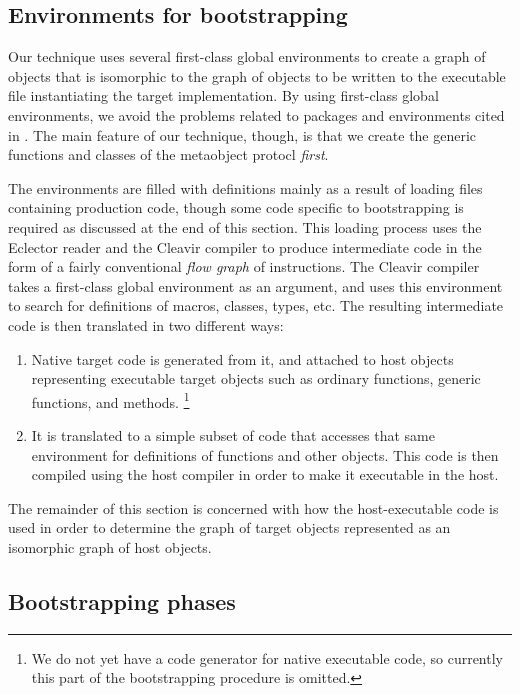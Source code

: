 \subsection{Environments for bootstrapping}

Our technique uses several first-class global environments
\cite{Strandh:2015:ELS:Environments} to create a graph of objects that
is isomorphic to the graph of objects to be written to the executable
file instantiating the target \commonlisp{} implementation.  By using
first-class global environments, we avoid the problems related to
packages and environments cited in .  The main
feature of our technique, though, is that we create the generic
functions and classes of the metaobject protocl \emph{first}.

The environments are filled with definitions mainly as a result of
loading files containing production \sicl{} code, though some code
specific to bootstrapping is required as discussed at the end of this
section.  This loading process uses the Eclector reader and the
Cleavir compiler to produce intermediate code in the form of a fairly
conventional \emph{flow graph} of instructions.  The Cleavir compiler
takes a first-class global environment as an argument, and uses this
environment to search for definitions of macros, classes, types, etc.
The resulting intermediate code is then translated in two different
ways:

\begin{enumerate}
\item Native target code is generated from it, and attached to host
  objects representing executable target objects such as ordinary
  functions, generic functions, and methods.%
  \footnote{We do not yet have a code generator for native executable
    code, so currently this part of the bootstrapping procedure is
    omitted.}
\item It is translated to a simple subset of \commonlisp{} code that
  accesses that same environment for definitions of functions and
  other objects.  This \commonlisp{} code is then compiled using the
  host compiler in order to make it executable in the host.
\end{enumerate}

The remainder of this section is concerned with how the
host-executable code is used in order to determine the graph of target
objects represented as an isomorphic graph of host objects.

\subsection{Bootstrapping phases}

